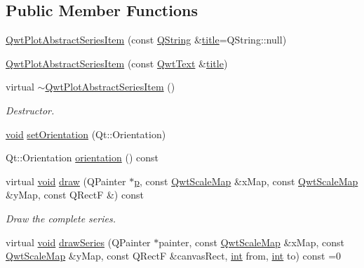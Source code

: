 \subsection*{Public Member Functions}
\begin{DoxyCompactItemize}
\item 
\hyperlink{class_qwt_plot_abstract_series_item_ad57bfd18c6f8e25c6fe214543b5f593e}{Qwt\-Plot\-Abstract\-Series\-Item} (const \hyperlink{group___u_a_v_objects_plugin_gab9d252f49c333c94a72f97ce3105a32d}{Q\-String} \&\hyperlink{class_qwt_plot_item_a3859d011b670b5f89e45d1ccef9206f7}{title}=Q\-String\-::null)
\item 
\hyperlink{class_qwt_plot_abstract_series_item_a3114a57978451fb4b940b94e79a8f42d}{Qwt\-Plot\-Abstract\-Series\-Item} (const \hyperlink{class_qwt_text}{Qwt\-Text} \&\hyperlink{class_qwt_plot_item_a3859d011b670b5f89e45d1ccef9206f7}{title})
\item 
virtual \hyperlink{class_qwt_plot_abstract_series_item_a0b35d4e683b1082dcf5c8a188243f26d}{$\sim$\-Qwt\-Plot\-Abstract\-Series\-Item} ()
\begin{DoxyCompactList}\small\item\em Destructor. \end{DoxyCompactList}\item 
\hyperlink{group___u_a_v_objects_plugin_ga444cf2ff3f0ecbe028adce838d373f5c}{void} \hyperlink{class_qwt_plot_abstract_series_item_ad1c9234a165e569633eb0b7f8c81c88b}{set\-Orientation} (Qt\-::\-Orientation)
\item 
Qt\-::\-Orientation \hyperlink{class_qwt_plot_abstract_series_item_aa51dc15e0845c1674602828a90d75f81}{orientation} () const 
\item 
virtual \hyperlink{group___u_a_v_objects_plugin_ga444cf2ff3f0ecbe028adce838d373f5c}{void} \hyperlink{class_qwt_plot_abstract_series_item_ae6592df5d033931bf6200cb68b6b34f0}{draw} (Q\-Painter $\ast$\hyperlink{glext_8h_aa5367c14d90f462230c2611b81b41d23}{p}, const \hyperlink{class_qwt_scale_map}{Qwt\-Scale\-Map} \&x\-Map, const \hyperlink{class_qwt_scale_map}{Qwt\-Scale\-Map} \&y\-Map, const Q\-Rect\-F \&) const 
\begin{DoxyCompactList}\small\item\em Draw the complete series. \end{DoxyCompactList}\item 
virtual \hyperlink{group___u_a_v_objects_plugin_ga444cf2ff3f0ecbe028adce838d373f5c}{void} \hyperlink{class_qwt_plot_abstract_series_item_ad411a172087666b4852ae244ac6f5663}{draw\-Series} (Q\-Painter $\ast$painter, const \hyperlink{class_qwt_scale_map}{Qwt\-Scale\-Map} \&x\-Map, const \hyperlink{class_qwt_scale_map}{Qwt\-Scale\-Map} \&y\-Map, const Q\-Rect\-F \&canvas\-Rect, \hyperlink{ioapi_8h_a787fa3cf048117ba7123753c1e74fcd6}{int} from, \hyperlink{ioapi_8h_a787fa3cf048117ba7123753c1e74fcd6}{int} to) const =0
\end{DoxyCompactItemize}
